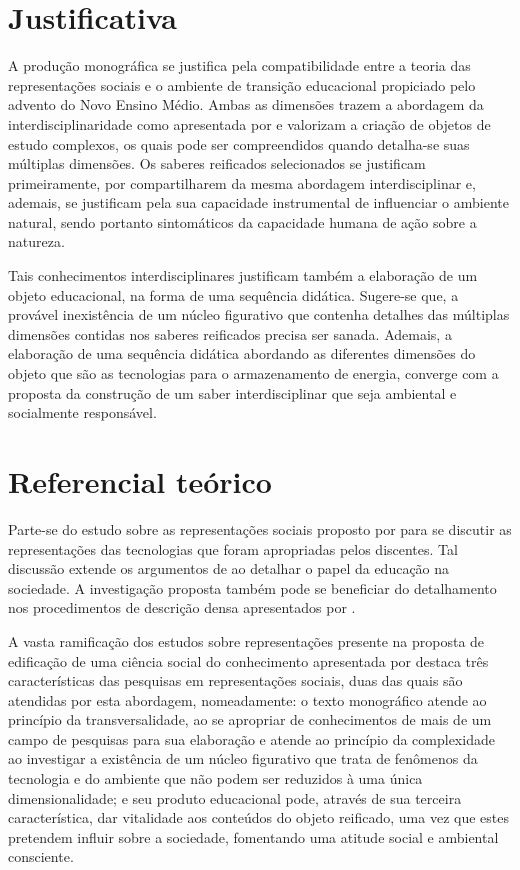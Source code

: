 \documentclass[
   article,       %
   12pt,          %
   oneside,       %
   a4paper,       %
   english,       %
   brazil,           %
   sumario=tradicional
   ]{abntex2}
\begin{document}
\section{Justificativa}

A produção monográfica se justifica pela compatibilidade entre a teoria das representações sociais e o ambiente de transição educacional propiciado pelo advento do Novo Ensino Médio. Ambas as dimensões trazem a abordagem da interdisciplinaridade como apresentada por \cite[p.56-58]{consideracoes_Interdisciplinaridade} e valorizam a criação de objetos de estudo complexos, os quais pode ser compreendidos quando detalha-se suas múltiplas dimensões. Os saberes reificados selecionados se justificam primeiramente, por compartilharem da mesma abordagem interdisciplinar e, ademais, se justificam pela sua capacidade instrumental de influenciar o ambiente natural, sendo portanto sintomáticos da capacidade humana de ação sobre a natureza.

Tais conhecimentos interdisciplinares justificam também a elaboração de um objeto educacional, na forma de uma sequência didática. Sugere-se que, a provável inexistência de um núcleo figurativo que contenha detalhes das múltiplas dimensões contidas nos saberes reificados precisa ser sanada. Ademais, a elaboração de uma sequência didática abordando as diferentes dimensões do objeto que são as tecnologias para o armazenamento de energia, converge com a proposta da construção de um saber interdisciplinar que seja ambiental e socialmente responsável. 


\section{Referencial teórico}

Parte-se do estudo sobre as representações sociais proposto por \cite{Representacees_sociais_moscovici} para se discutir as representações das tecnologias que foram apropriadas pelos discentes. Tal discussão extende os argumentos de \cite{Durkheim_Educacao} ao detalhar o papel da educação na sociedade. A investigação proposta também pode se beneficiar do detalhamento nos procedimentos de descrição densa apresentados por \cite{Culturas_Geertz}.

A vasta ramificação dos estudos sobre representações presente na proposta de edificação de uma ciência social do conhecimento apresentada por \cite[p.6]{Representacoes_Jodelet} destaca três características das pesquisas em representações sociais, duas das quais são atendidas por esta abordagem, nomeadamente: o texto monográfico atende ao princípio da transversalidade, ao se apropriar de conhecimentos de mais de um campo de pesquisas para sua elaboração e atende ao princípio da complexidade ao investigar a existência de um núcleo figurativo que trata de fenômenos da tecnologia e do ambiente que não podem ser reduzidos à uma única dimensionalidade; e seu produto educacional pode, através de sua terceira característica, dar vitalidade aos conteúdos do objeto reificado, uma vez que estes pretendem influir sobre a sociedade, fomentando uma atitude social e ambiental consciente.
\end{document}
